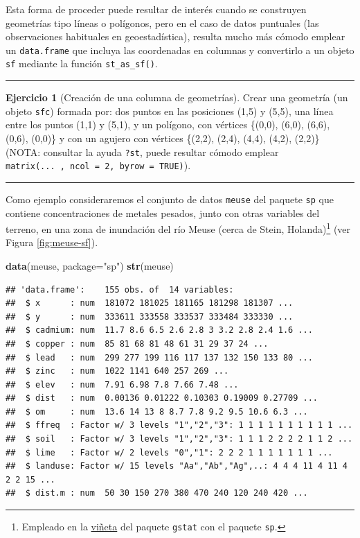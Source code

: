 \documentclass[
]{book}
\newenvironment{Shaded}{\begin{snugshade}}{\end{snugshade}}
\newcommand{\AttributeTok}[1]{\textcolor[rgb]{0.13,0.29,0.53}{#1}}
\newcommand{\FunctionTok}[1]{\textcolor[rgb]{0.13,0.29,0.53}{\textbf{#1}}}
\newcommand{\NormalTok}[1]{#1}
\newcommand{\StringTok}[1]{\textcolor[rgb]{0.31,0.60,0.02}{#1}}
\theoremstyle{break}
\theoremstyle{definition}
\theoremstyle{definition}
\theoremstyle{definition}
\newtheorem{exercise}{Ejercicio}[chapter]
\theoremstyle{definition}
\theoremstyle{remark}
\begin{document}
Esta forma de proceder puede resultar de interés cuando se construyen geometrías tipo líneas o polígonos, pero en el caso de datos puntuales (las observaciones habituales en geoestadística), resulta mucho más cómodo emplear un \texttt{data.frame} que incluya las coordenadas en columnas y convertirlo a un objeto \texttt{sf} mediante la función \texttt{st\_as\_sf()}.

\begin{center}\rule{0.5\linewidth}{0.5pt}\end{center}

\begin{exercise}[Creación de una columna de geometrías]
\protect\hypertarget{exr:sfc}{}\label{exr:sfc}Crear una geometría (un objeto \texttt{sfc}) formada por: dos puntos en las posiciones
(1,5) y (5,5), una línea entre los puntos (1,1) y (5,1), y un polígono, con vértices
\{(0,0), (6,0), (6,6), (0,6), (0,0)\} y con un agujero con vértices \{(2,2), (2,4),
(4,4), (4,2), (2,2)\} (NOTA: consultar la ayuda \texttt{?st}, puede resultar cómodo emplear
\texttt{matrix(...\ ,\ ncol\ =\ 2,\ byrow\ =\ TRUE)}).
\end{exercise}

\begin{center}\rule{0.5\linewidth}{0.5pt}\end{center}

Como ejemplo consideraremos el conjunto de datos \texttt{meuse} del paquete \texttt{sp} que contiene concentraciones de metales pesados, junto con otras variables del terreno, en una zona de inundación del río Meuse (cerca de Stein, Holanda)\footnote{Empleado en la \href{https://cran.r-project.org/web/packages/gstat/vignettes/gstat.pdf}{viñeta} del paquete \texttt{gstat} con el paquete \texttt{sp}.} (ver Figura \ref{fig:meuse-sf}).

\begin{Shaded}
\begin{Highlighting}[]
\FunctionTok{data}\NormalTok{(meuse, }\AttributeTok{package=}\StringTok{"sp"}\NormalTok{)}
\FunctionTok{str}\NormalTok{(meuse)}
\end{Highlighting}
\end{Shaded}

\begin{verbatim}
## 'data.frame':    155 obs. of  14 variables:
##  $ x      : num  181072 181025 181165 181298 181307 ...
##  $ y      : num  333611 333558 333537 333484 333330 ...
##  $ cadmium: num  11.7 8.6 6.5 2.6 2.8 3 3.2 2.8 2.4 1.6 ...
##  $ copper : num  85 81 68 81 48 61 31 29 37 24 ...
##  $ lead   : num  299 277 199 116 117 137 132 150 133 80 ...
##  $ zinc   : num  1022 1141 640 257 269 ...
##  $ elev   : num  7.91 6.98 7.8 7.66 7.48 ...
##  $ dist   : num  0.00136 0.01222 0.10303 0.19009 0.27709 ...
##  $ om     : num  13.6 14 13 8 8.7 7.8 9.2 9.5 10.6 6.3 ...
##  $ ffreq  : Factor w/ 3 levels "1","2","3": 1 1 1 1 1 1 1 1 1 1 ...
##  $ soil   : Factor w/ 3 levels "1","2","3": 1 1 1 2 2 2 2 1 1 2 ...
##  $ lime   : Factor w/ 2 levels "0","1": 2 2 2 1 1 1 1 1 1 1 ...
##  $ landuse: Factor w/ 15 levels "Aa","Ab","Ag",..: 4 4 4 11 4 11 4 2 2 15 ...
##  $ dist.m : num  50 30 150 270 380 470 240 120 240 420 ...
\end{verbatim}
\end{document}
